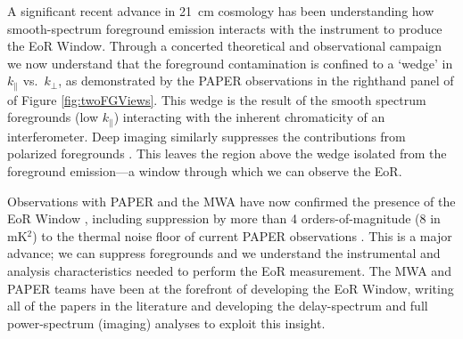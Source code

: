 \documentclass[preprint]{aastex}
\def\kperp{k_{\bot}}
\def\kpar{k_{\|}}
\begin{document}
A significant recent advance in 21~cm cosmology has been understanding how smooth-spectrum
foreground emission interacts with the instrument to produce the EoR Window.
Through a concerted theoretical and observational campaign
\citep{morales_et_al2012,parsons_et_al2012b,vedantham_2012,Datta_2010,hazelton_et_al2013,pober_et_al2013,parsons_et_al2013,dillon_et_al2013b_trunc}
we now understand that the foreground contamination is confined to a `wedge' in
$\kpar$ vs.\ $\kperp$, as demonstrated by the PAPER observations in the
righthand panel of of Figure \ref{fig:twoFGViews}. This wedge is the result of
the smooth spectrum foregrounds (low $\kpar$) interacting with the inherent
chromaticity of an interferometer. Deep imaging similarly suppresses the 
contributions from polarized foregrounds \citep{bernardi_2013_trunc,moore_et_al2013}. 
This leaves the region above the wedge isolated from the
foreground emission---a window through which we can observe the EoR.


Observations with PAPER and the MWA have now confirmed the presence of the EoR Window
\citep{pober_et_al2013,dillon_et_al2013b_trunc}, including suppression by more than 4
orders-of-magnitude (8 in mK$^{2}$) to the thermal noise floor of current
PAPER observations \citep{parsons_et_al2013}. This is a major advance; we can
suppress foregrounds and we understand the instrumental and analysis %
characteristics needed to perform the EoR measurement. The MWA and PAPER teams
have been at the forefront of developing the EoR Window, writing all of the %
papers in the literature and developing the 
delay-spectrum and full power-spectrum (imaging) analyses to exploit this
insight. 

\end{document}
